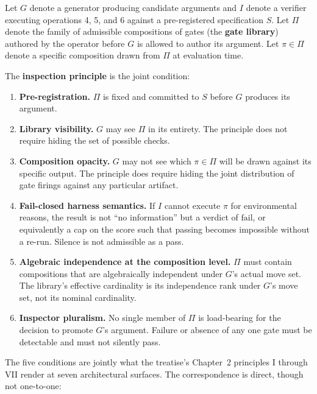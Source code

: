 \documentclass[11pt]{article}
\begin{document}
Let $G$ denote a generator producing candidate arguments and $I$ denote a verifier executing operations 4, 5, and 6 against a pre-registered specification $S$. Let $\Pi$ denote the family of admissible compositions of gates (the \textbf{gate library}) authored by the operator before $G$ is allowed to author its argument. Let $\pi \in \Pi$ denote a specific composition drawn from $\Pi$ at evaluation time.

The \textbf{inspection principle} is the joint condition:

\begin{enumerate}
\item \textbf{Pre-registration.} $\Pi$ is fixed and committed to $S$ before $G$ produces its argument.
\item \textbf{Library visibility.} $G$ may see $\Pi$ in its entirety. The principle does not require hiding the set of possible checks.
\item \textbf{Composition opacity.} $G$ may not see which $\pi \in \Pi$ will be drawn against its specific output. The principle does require hiding the joint distribution of gate firings against any particular artifact.
\item \textbf{Fail-closed harness semantics.} If $I$ cannot execute $\pi$ for environmental reasons, the result is not ``no information'' but a verdict of $\text{fail}$, or equivalently a cap on the score such that passing becomes impossible without a re-run. Silence is not admissible as a pass.
\item \textbf{Algebraic independence at the composition level.} $\Pi$ must contain compositions that are algebraically independent under $G$'s actual move set. The library's effective cardinality is its independence rank under $G$'s move set, not its nominal cardinality.
\item \textbf{Inspector pluralism.} No single member of $\Pi$ is load-bearing for the decision to promote $G$'s argument. Failure or absence of any one gate must be detectable and must not silently pass.
\end{enumerate}

The five conditions are jointly what the treatise's Chapter~2 principles I through VII render at seven architectural surfaces. The correspondence is direct, though not one-to-one:
\end{document}
